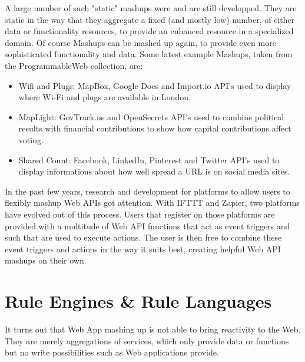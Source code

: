 
A large number of such "static" mashups were and are still developped.
They are static in the way that they aggregate a fixed (and mostly low) number, of either data or functionality resources, to provide an enhanced resource in a specialized domain.
Of course Mashups can be mashed up again, to provide even more sophisticated functionality and data.
Some latest example Mashups, taken from the ProgrammableWeb collection, are:

\begin{itemize}
  \item Wifi and Plugs: MapBox, Google Docs and Import.io API's used to display where Wi-Fi and plugs are available in London.
  \item MapLight: GovTrack.us and OpenSecrets API's used to combine political results with financial contributions to show how capital contributions affect voting.
  \item Shared Count: Facebook, LinkedIn, Pinterest and Twitter API's used to display informations about how well spread a URL is on social media sites.
\end{itemize}

In the past few years, research and development for platforms to allow users to flexibly mashup Web APIs got attention.
With IFTTT and Zapier, two platforms have evolved out of this process.
Users that register on those platforms are provided with a multitude of Web API functions that act as event triggers and such that are used to execute actions.
The user is then free to combine these event triggers and actions in the way it suits best, creating helpful Web API mashups on their own.




\section{Rule Engines \& Rule Languages}

It turns out that Web App mashing up is not able to bring reactivity to the Web.
They are merely aggregations of services, which only provide data or functions but no write possibilities such as Web applications provide.


